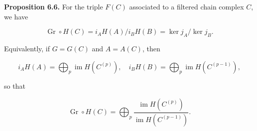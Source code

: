 \textbf{Proposition 6.6.} For the triple $F(C)$ associated to a filtered chain complex $C$, we have

$$\operatorname{Gr} \circ H(C) = i_A H(A) / i_B H(B) = \ker j_A / \ker j_B.$$

Equivalently, if $G = G(C)$ and $A = A(C)$, then

$$i_A H(A) = \bigoplus_p \operatorname{im} H(C^{(p)}), \quad i_B H(B) = \bigoplus_p \operatorname{im} H(C^{(p-1)}),$$

so that

$$\operatorname{Gr} \circ H(C) = \bigoplus_p \frac{\operatorname{im} H(C^{(p)})}{\operatorname{im} H(C^{(p-1)})}.$$
